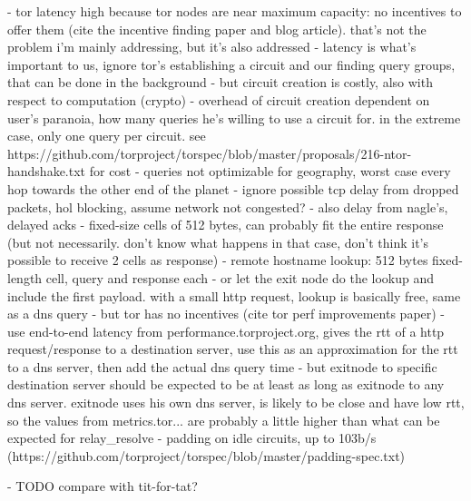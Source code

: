 - tor latency high because tor nodes are near maximum capacity: no incentives to
  offer them (cite the incentive finding paper and blog article). that's not the
  problem i'm mainly addressing, but it's also addressed
- latency is what's important to us, ignore tor's establishing a circuit and our
  finding query groups, that can be done in the background
- but circuit creation is costly, also with respect to computation (crypto)
- overhead of circuit creation dependent on user's paranoia, how many queries
  he's willing to use a circuit for. in the extreme case, only one query per
  circuit. see
  https://github.com/torproject/torspec/blob/master/proposals/216-ntor-handshake.txt
  for cost
- queries not optimizable for geography, worst case every hop towards the other
  end of the planet
- ignore possible tcp delay from dropped packets, hol blocking, assume network
  not congested?
    - also delay from nagle's, delayed acks
- fixed-size cells of 512 bytes, can probably fit the entire response (but not
  necessarily. don't know what happens in that case, don't think it's possible
  to receive 2 cells as response)
- remote hostname lookup: 512 bytes fixed-length cell, query and response each
- or let the exit node do the lookup and include the first payload. with a small
  http request, lookup is basically free, same as a dns query
- but tor has no incentives (cite tor perf improvements paper)
- use end-to-end latency from performance.torproject.org, gives the rtt of a
  http request/response to a destination server, use this as an approximation
  for the rtt to a dns server, then add the actual dns query time
    - but exitnode to specific destination server should be expected to be at
      least as long as exitnode to any dns server. exitnode uses his own dns
      server, is likely to be close and have low rtt, so the values from
      metrics.tor... are probably a little higher than what can be expected for
      relay\_resolve
- %
  padding on idle circuits, up to 103b/s
  (https://github.com/torproject/torspec/blob/master/padding-spec.txt)

- TODO compare with tit-for-tat?
